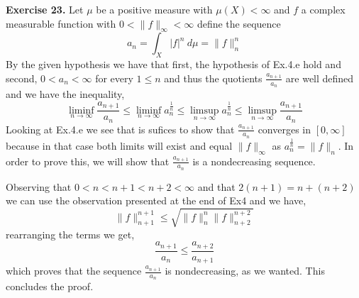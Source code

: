 \documentclass{article}
\begin{document}
\bigbreak

\begin{exercise}\textbf{Exercise 23.}
    Let $\mu$ be a positive measure with $\mu \left( X \right) < \infty$ and $f$ a complex measurable function with $0 < \|f\|_\infty < \infty $ define the sequence
    \[
        a_n = \int_X |f|^n\: d\mu  = \|f\|_n^n
    \]
    By the given hypothesis we have that first, the hypothesis of Ex.4.e hold and second, $0 < a_n < \infty$ for every $ 1 \le n$ and thus the quotients $\frac{a_{n+1}}{a_n}$ are well defined and we have the inequality,
    \[
        \liminf_{n \to \infty} \frac{a_{n+1}}{a_n} \le \liminf_{n \to \infty}a_n^{\frac{1}{n}} \le \limsup_{n \to \infty} a_n^{\frac{1}{n}} \le \limsup_{n \to \infty} \frac{a_{n+1}}{a_n}
    \]
    Looking at Ex.4.e we see that is sufices to show that $\frac{a_{n+1}}{a_n}$ converges in $[0,\infty]$ because in that case both limits will exist and equal $\|f\|_\infty $ as $a_n^{\frac{1}{n}} = \|f\|_n$. In order to prove this, we will show that $\frac{a_{n+1}}{a_n}$ is a nondecreasing sequence.

    Observing that $0 < n < n+1 < n+2 < \infty$ and that $2 \left( n+1 \right) = n + \left( n+2 \right) $ we can use the observation presented at the end of Ex4 and we have,
    \[
        \|f\|_{n+1}^{n+1} \le \sqrt{\|f\|_n^n \|f\|_{n+2}^{n+2}}  
    \]
    rearranging the terms we get,
    \[
        \frac{a_{n+1}}{a_n} \le \frac{a_{n+2}}{a_{n+1}}
    \]
    which proves that the sequence $\frac{a_{n+1}}{a_n}$ is nondecreasing, as we wanted. This concludes the proof.
\end{exercise}
\end{document}
